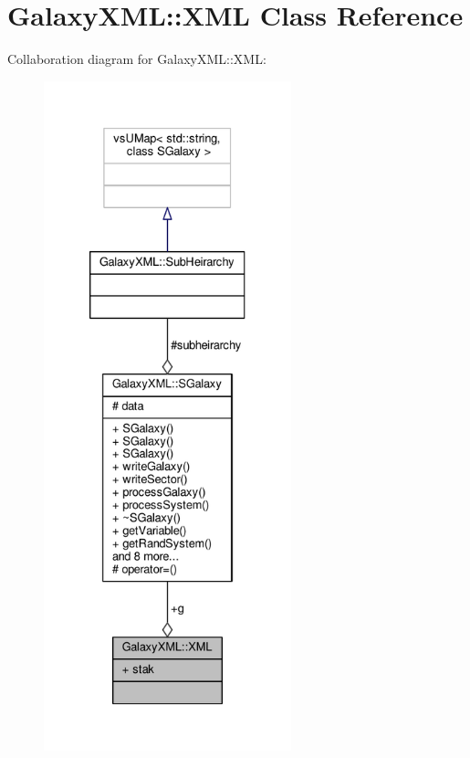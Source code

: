 \hypertarget{classGalaxyXML_1_1XML}{}\section{Galaxy\+X\+ML\+:\+:X\+ML Class Reference}
\label{classGalaxyXML_1_1XML}


Collaboration diagram for Galaxy\+X\+ML\+:\+:X\+ML\+:
\nopagebreak
\begin{figure}[H]
\begin{center}
\leavevmode
\includegraphics[height=550pt]{df/db3/classGalaxyXML_1_1XML__coll__graph}
\end{center}
\end{figure}
